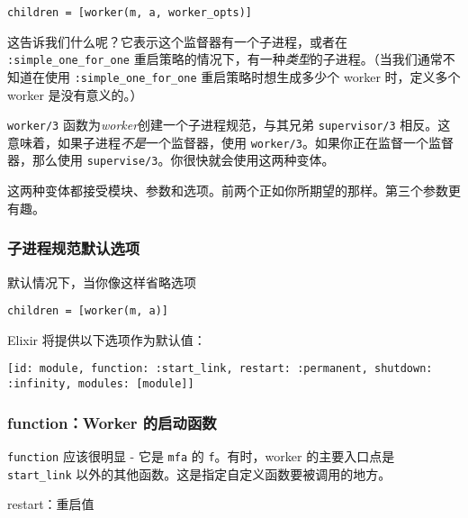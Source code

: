 \begin{code}{}
\begin{verbatim}
children = [worker(m, a, worker_opts)]
\end{verbatim}
\end{code}

这告诉我们什么呢？它表示这个监督器有一个子进程，或者在
\texttt{:simple\_one\_for\_one}
重启策略的情况下，有一种\emph{类型}的子进程。（当我们通常不知道在使用
\texttt{:simple\_one\_for\_one} 重启策略时想生成多少个
worker 时，定义多个 worker 是没有意义的。）

\texttt{worker/3}
函数为\emph{worker}创建一个子进程规范，与其兄弟
\texttt{supervisor/3}
相反。这意味着，如果子进程\emph{不是}一个监督器，使用
\texttt{worker/3}。如果你正在监督一个监督器，那么使用
\texttt{supervise/3}。你很快就会使用这两种变体。

这两种变体都接受模块、参数和选项。前两个正如你所期望的那样。第三个参数更有趣。


\subsubsection{子进程规范默认选项}

默认情况下，当你像这样省略选项

\begin{code}{}
\begin{verbatim}
children = [worker(m, a)]
\end{verbatim}
\end{code}

Elixir 将提供以下选项作为默认值：

\begin{code}{}
\begin{verbatim}
[id: module, function: :start_link, restart: :permanent, shutdown: :infinity, modules: [module]]
\end{verbatim}
\end{code}


\subsubsection{function：Worker
的启动函数}

\texttt{function} 应该很明显 - 它是
\texttt{mfa} 的
\texttt{f}。有时，worker 的主要入口点是
\texttt{start\_link}
以外的其他函数。这是指定自定义函数要被调用的地方。

restart：重启值

